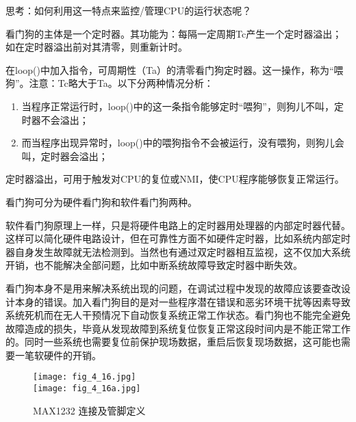 \begin{description}
\begin{remark}
思考：如何利用这一特点来监控/管理CPU的运行状态呢？



看门狗的主体是一个定时器。其功能为：每隔一定周期Tc产生一个定时器溢出；如在定时器溢出前对其清零，则重新计时。

在loop()中加入指令，可周期性（Ta）的清零看门狗定时器。这一操作，称为“喂狗”。注意：Tc略大于Ta。以下分两种情况分析：

\begin{enumerate}
  \item 当程序正常运行时，loop()中的这一条指令能够定时“喂狗”，则狗儿不叫，定时器不会溢出；
  \item 而当程序出现异常时，loop()中的喂狗指令不会被运行，没有喂狗，则狗儿会叫，定时器会溢出；
\end{enumerate}

定时器溢出，可用于触发对CPU的复位或NMI，使CPU程序能够恢复正常运行。

\end{remark}

\begin{remark}

看门狗可分为硬件看门狗和软件看门狗两种。


软件看门狗原理上一样，只是将硬件电路上的定时器用处理器的内部定时器代替。这样可以简化硬件电路设计，但在可靠性方面不如硬件定时器，比如系统内部定时器自身发生故障就无法检测到。当然也有通过双定时器相互监视，这不仅加大系统开销，也不能解决全部问题，比如中断系统故障导致定时器中断失效。

看门狗本身不是用来解决系统出现的问题，在调试过程中发现的故障应该要查改设计本身的错误。加入看门狗目的是对一些程序潜在错误和恶劣环境干扰等因素导致系统死机而在无人干预情况下自动恢复系统正常工作状态。看门狗也不能完全避免故障造成的损失，毕竟从发现故障到系统复位恢复正常这段时间内是不能正常工作的。同时一些系统也需要复位前保护现场数据，重启后恢复现场数据，这可能也需要一笔软硬件的开销。
\end{remark}

\end{description}

\begin{figure}[h]
  \centering
  \texttt{[image: fig\_4\_16.jpg]}\\
  \texttt{[image: fig\_4\_16a.jpg]}
  \caption{MAX1232 连接及管脚定义}\label{fig_4_16}
\end{figure}




